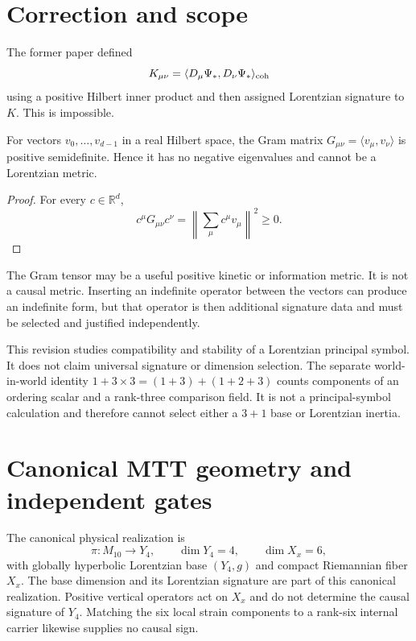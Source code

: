 \documentclass[11pt]{article}
\begin{document}
\tableofcontents

\section{Correction and scope}

The former paper defined
\[
 K_{\mu\nu}=\langle D_\mu\Psi_\ast,D_\nu\Psi_\ast\rangle_{\rm coh}
\]
using a positive Hilbert inner product and then assigned Lorentzian signature
to $K$. This is impossible.

\begin{proposition}\label{prop:gram}
For vectors $v_0,\ldots,v_{d-1}$ in a real Hilbert space, the Gram matrix
$G_{\mu\nu}=\langle v_\mu,v_\nu\rangle$ is positive semidefinite. Hence it has
no negative eigenvalues and cannot be a Lorentzian metric.
\end{proposition}

\begin{proof}
For every $c\in\mathbb R^d$,
\[
 c^\mu G_{\mu\nu}c^\nu
 =\left\|\sum_\mu c^\mu v_\mu\right\|^2\ge0.
\]
\end{proof}

The Gram tensor may be a useful positive kinetic or information metric. It is
not a causal metric. Inserting an indefinite operator between the vectors can
produce an indefinite form, but that operator is then additional signature
data and must be selected and justified independently.

This revision studies compatibility and stability of a Lorentzian principal
symbol. It does not claim universal signature or dimension selection.
The separate world-in-world identity
$1+3\times3=(1+3)+(1+2+3)$ counts components of an ordering scalar and a
rank-three comparison field. It is not a principal-symbol calculation and
therefore cannot select either a $3+1$ base or Lorentzian inertia.

\section{Canonical MTT geometry and independent gates}

The canonical physical realization is
\[
 \pi:M_{10}\to Y_4,
 \qquad \dim Y_4=4,
 \qquad \dim X_x=6,
\]
with globally hyperbolic Lorentzian base $(Y_4,g)$ and compact Riemannian fiber
$X_x$. The base dimension and its Lorentzian signature are part of this
canonical realization. Positive vertical operators act on $X_x$ and do not
determine the causal signature of $Y_4$. Matching the six local strain
components to a rank-six internal carrier likewise supplies no causal sign.
\end{document}
